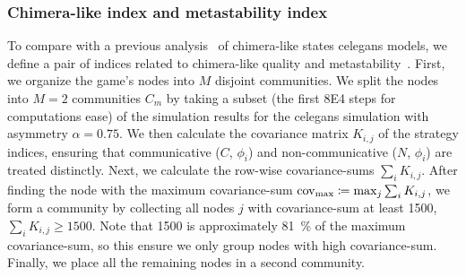 \documentclass[pdflatex,twocolumn,sn-nature,super]{sn-jnl}
\begin{document}
\subsubsection{Chimera-like index and metastability index}\label{sec:chimera-metastability-def}
To compare with a previous analysis~\citep{hizanidis2016chimera} of
chimera-like states \gls{celegans} models,
we define a pair of indices related to
chimera-like quality and metastability~\citep{shanahan2010metastable}.
First, we organize the game's nodes
into $M$ disjoint communities.
We split the nodes into $M=2$ communities $C_m$
by taking a subset
(the first \num{8E4} steps for computations ease)
of the simulation results
for the \gls{celegans} simulation with asymmetry $\alpha = \num{0.75}$.
We then calculate the covariance matrix $K_{i,j}$ of the strategy indices,
ensuring that communicative ($C$, $\phi_i$)
and non-communicative ($N$, $\phi_i$) are treated distinctly.
Next, we calculate the row-wise covariance-sums  $\sum_i K_{i,j}$.
After finding the node with the maximum covariance-sum
$\operatorname{cov}_{\text{max}} \coloneqq \max_j{\sum_i K_{i,j}}$,
we form a community by collecting all nodes $j$ with covariance-sum
at least \num{1500}, $\sum_i K_{i,j} \ge 1500$.
Note that \num{1500} is approximately \SI{81}{\percent}
of the maximum covariance-sum,
so this ensure we only group nodes with high covariance-sum.
Finally, we place all the remaining nodes in a second community.
\end{document}
